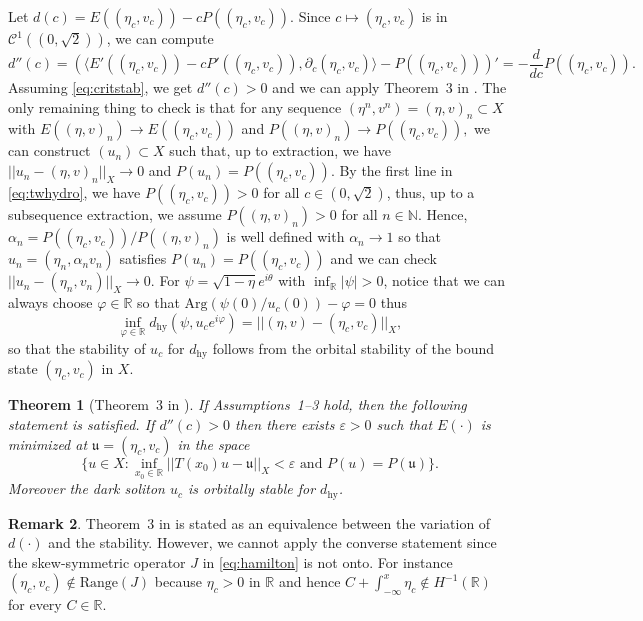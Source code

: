 \documentclass[11pt]{article}
\newcommand{\N}{\mathbb{N}}
\newcommand{\R}{\mathbb{R}}
\newcommand{\boC}{\mathcal{C}}
\theoremstyle{plain}
\newtheorem{theorem}{Theorem}[section]
\theoremstyle{definition}
\newtheorem{remark}[theorem]{Remark}
\theoremstyle{remark}
\numberwithin{equation}{section}
\begin{document}
{	
	Let $d(c)=E((\eta_c,v_c))-cP((\eta_c,v_c))$. Since $c\mapsto(\eta_c,v_c)$ is in $\boC^1((0,\sqrt{2}))$, we can compute
	\begin{equation}\label{eq:critgss}
		d''(c)=\left(\langle E'((\eta_c,v_c))-cP'((\eta_c,v_c)),\partial_c(\eta_c,v_c)\rangle-P((\eta_c,v_c))\right)'=-\frac{d}{dc}P((\eta_c,v_c)).
	\end{equation}
	Assuming \eqref{eq:critstab}, we get $d''(c)>0$ and we can apply Theorem~3 in \cite{grillakisshatah}. The only remaining thing to check is that for any sequence $(\eta^n,v^n)=(\eta,v)_n\subset X$ with $E((\eta,v)_n)\to E((\eta_c,v_c))$ and $P((\eta,v)_n)\to P((\eta_c,v_c)),$ we can construct $(u_n)\subset X$ such that, up to extraction, we have $||u_n-(\eta,v)_n||_X\to0$ and $P(u_n)=P((\eta_c,v_c))$. By the first line in \eqref{eq:twhydro}, we have $P((\eta_c,v_c))>0$ for all $c\in(0,\sqrt{2})$, thus, up to a subsequence extraction, we assume   $P((\eta,v)_n)>0$ for all $n\in\N$. Hence, $\alpha_n=P((\eta_c,v_c))/P((\eta,v)_n)$ is well defined with $\alpha_n\to1$ so that $u_n=(\eta_n,\alpha_nv_n)$ satisfies $P(u_n)=P((\eta_c,v_c))$ and we can check $||u_n-(\eta_n,v_n)||_X\to0$. For $\psi=\sqrt{1-\eta}e^{i\theta}$ with $\inf_\R|\psi|>0$, notice that we can always choose $\varphi\in\R$ so that $\mathrm{Arg}(\psi(0)/u_c(0))-\varphi=0$ thus 
	$$\inf_{\varphi\in\R}d_{\mathrm{hy}}(\psi,u_ce^{i\varphi})=||(\eta,v)-(\eta_c,v_c)||_X,$$ 
	so that the stability of $u_c$ for $d_{\mathrm{hy}}$ follows from the orbital stability of the bound state $(\eta_c,v_c)$ in $X$.
	\begin{theorem}[Theorem~3 in \cite{grillakisshatah}]\label{thm:stabgss}
		If Assumptions~1--3 hold, then the following statement is satisfied.
		If $d''(c)>0$ then there exists $\varepsilon>0$ such that $E(\cdot)$ is minimized at $\mathfrak u=(\eta_c,v_c)$ in the space 
		$$\{u\in X : \inf_{x_0\in\R}||T(x_0)u-\mathfrak u||_{X}<\varepsilon\text{ and }P(u)=P(\mathfrak u)\}.$$
		Moreover the dark soliton $u_c$ is orbitally stable for $d_{\mathrm{hy}}$.
	\end{theorem}
	\begin{remark}\label{rem:onto}
		Theorem~3 in \cite{grillakisshatah} is stated as an equivalence between the variation of $d(\cdot)$ and the stability. However, we cannot apply the converse statement since the skew-symmetric operator  $J$ in \eqref{eq:hamilton} is not onto. For instance $(\eta_c,v_c)\notin \mathrm{Range}(J)$ because  $\eta_c>0$ in $\R$ and hence $C+\int^x_{-\infty}\eta_c\notin  H^{{-1}}(\R)$ for every $C\in\R$.
	\end{remark}
}
\end{document}
